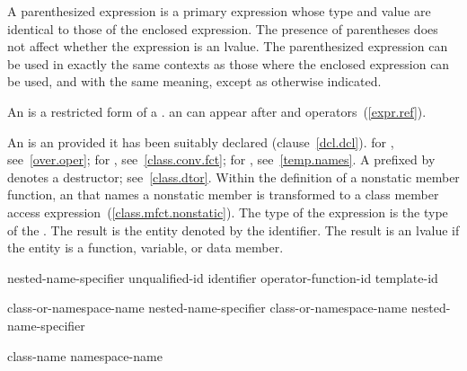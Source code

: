 \pnum
{}%
A parenthesized expression is a primary expression whose type and value
are identical to those of the enclosed expression. The presence of
parentheses does not affect whether the expression is an lvalue. The
parenthesized expression can be used in exactly the same contexts as
those where the enclosed expression can be used, and with the same
meaning, except as otherwise indicated.

\pnum
{}%
%
An  is a restricted form of a
.
\enternote 
an  can appear after  and \tcode{->}
operators~(\ref{expr.ref}).
\exitnote 

\pnum
{}%
An  is an  provided it has
been suitably declared (clause~\ref{dcl.dcl}).
\enternote 
for , see~\ref{over.oper}; for
, see~\ref{class.conv.fct}; for
, see~\ref{temp.names}. A 
prefixed by \tcode{\tilde} denotes a destructor; see~\ref{class.dtor}.
Within the definition of a nonstatic member function, an
 that names a nonstatic member is transformed to a
class member access expression~(\ref{class.mfct.nonstatic}).
\exitnote 
The type of the expression is the type of the . The
result is the entity denoted by the identifier. The result is an lvalue
if the entity is a function, variable, or data member.

%
%
%
\begin{bnf}
\br
    \terminal{::}\opt nested-name-specifier \opt unqualified-id\br
    \terminal{::} identifier\br
    \terminal{::} operator-function-id\br
    \terminal{::} template-id
\end{bnf}

%
%
%
\begin{bnf}
\br
    class-or-namespace-name \terminal{::} nested-name-specifier\opt\br
    class-or-namespace-name \terminal{::}  nested-name-specifier
\end{bnf}

\begin{bnf}
\br
    class-name\br
    namespace-name
\end{bnf}

